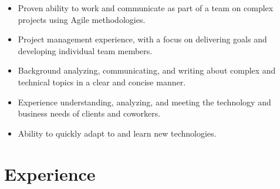 \documentclass[10pt]{article}
\begin{document}
\begin{itemize}

    \item Proven ability to work and communicate as part of a team on complex projects using Agile methodologies.
    
    \item Project management experience, with a focus on delivering goals and developing individual team members.

    \item Background analyzing, communicating, and writing about complex and technical topics in a clear and concise manner.

    \item Experience understanding, analyzing, and meeting the technology and business needs of clients and coworkers.

    \item Ability to quickly adapt to and learn new technologies.

\end{itemize}



\section{Experience}
\end{document}

